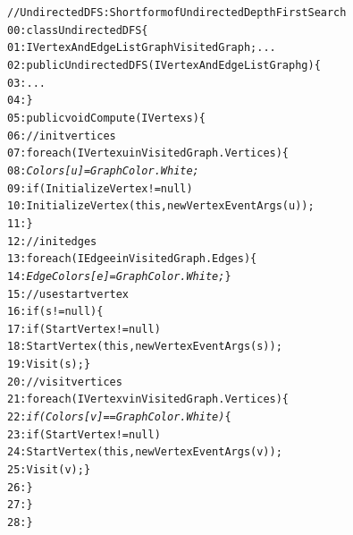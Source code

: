 \documentclass{sig-alternate}
\begin{document}
\begin{figure}[t]
\begin{CodeOut}
\begin{alltt}
//UndirectedDFS: Short form of UndirectedDepthFirstSearch
00:class UndirectedDFS \{
01:\hspace*{0.1in}IVertexAndEdgeListGraph VisitedGraph; ...
02:\hspace*{0.1in}public UndirectedDFS(IVertexAndEdgeListGraph g) \{ 
03:\hspace*{0.2in}... 
04:\hspace*{0.1in}\}
05:\hspace*{0.1in}public void Compute(IVertex s) \{
06:\hspace*{0.2in}//init vertices
07:\hspace*{0.2in}foreach(IVertex u in VisitedGraph.Vertices) \{
08:\hspace*{0.3in}\emph{Colors[u]=GraphColor.White;}
09:\hspace*{0.3in}if (InitializeVertex != null)
10:\hspace*{0.3in}InitializeVertex(this, new VertexEventArgs(u));
11:\hspace*{0.2in}\}
12:\hspace*{0.2in}//init edges
13:\hspace*{0.2in}foreach(IEdge e in VisitedGraph.Edges) \{
14:\hspace*{0.3in}\emph{EdgeColors[e]=GraphColor.White;} \}
15:\hspace*{0.2in}//use start vertex			
16:\hspace*{0.2in}if (s != null) \{
17:\hspace*{0.3in}if (StartVertex != null)
18:\hspace*{0.4in}StartVertex(this,new VertexEventArgs(s));
19:\hspace*{0.3in}Visit(s); \}
20:\hspace*{0.2in}// visit vertices
21:\hspace*{0.2in}foreach(IVertex v in VisitedGraph.Vertices) \{
22:\hspace*{0.3in}\emph{if (Colors[v] == GraphColor.White)} \{
23:\hspace*{0.4in}if (StartVertex != null)
24:\hspace*{0.5in}StartVertex(this,new VertexEventArgs(v));
25:\hspace*{0.4in}Visit(v); \}
26:\hspace*{0.2in}\}
27:\hspace*{0.1in}\}
28:\}
\end{alltt}
\end{CodeOut} \vspace*{-4ex}
 \vspace*{-5ex}
\end{figure}
\end{document}

